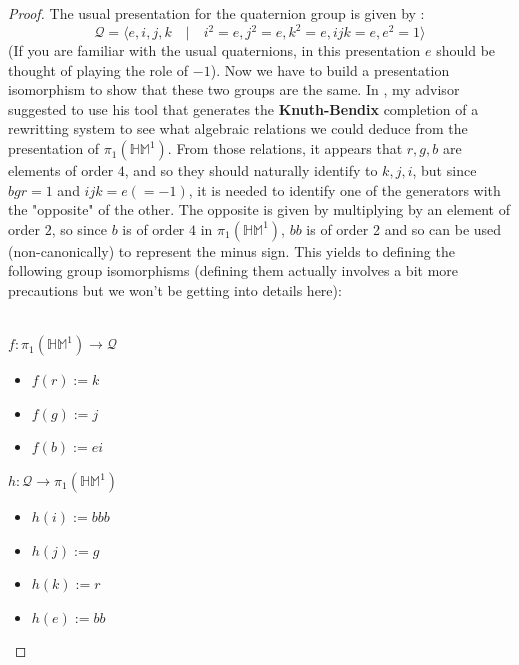 \documentclass{report}
\begin{document}
\begin{proof} The usual presentation for the quaternion group is given by : 
  $$\mathcal{Q}  = \langle e,i,j,k \quad \vert \quad i^2 =e, j^2=e, k^2=e, ijk=e, e^2=1 \rangle$$
  (If you are familiar with the usual quaternions, in this presentation $e$ should be thought of  playing the role of $-1$).
  Now we have to build a presentation isomorphism to show that these two groups are the same. In \cite{QuaternionPresentation}, my advisor suggested to use his tool that generates the \textbf{Knuth-Bendix} completion of a rewritting system to see what algebraic relations we could deduce from the presentation of $\pi_1(\mathbb{HM}^1)$. From those relations, it appears that $r,g,b$ are elements of order $4$, and so they should naturally identify to $k,j,i$, but since $bgr=1$ and $ijk=e(=-1)$, it is needed to identify one of the generators with the "opposite" of the other. The opposite is given by multiplying by an element of order $2$, so since $b$ is of order $4$ in $\pi_1(\mathbb{HM}^1)$, $bb$ is of order 2 and so can be used (non-canonically) to represent the minus sign. This yields to defining the following group isomorphisms (defining them actually involves a bit more precautions but we won't be getting into details here):\\\\
  \begin{minipage}{.5\textwidth} 
    $f : \pi_1(\mathbb{HM}^1) \rightarrow \mathcal{Q}$
    \begin{itemize}
      \item $f(r) := k$
      \item $f(g) := j$
      \item $f(b) :=ei$
    \end{itemize}
  \end{minipage}
  \hfill 
  \begin{minipage}{.5\textwidth} 
    $h : \mathcal{Q} \rightarrow \pi_1(\mathbb{HM}^1)$
    \begin{itemize}
      \item $h(i) := bbb$
      \item $h(j) := g$
      \item $h(k) := r$
      \item $h(e) :=bb$
    \end{itemize}
  \end{minipage}
\end{proof}
\printbibliography
\end{document}
